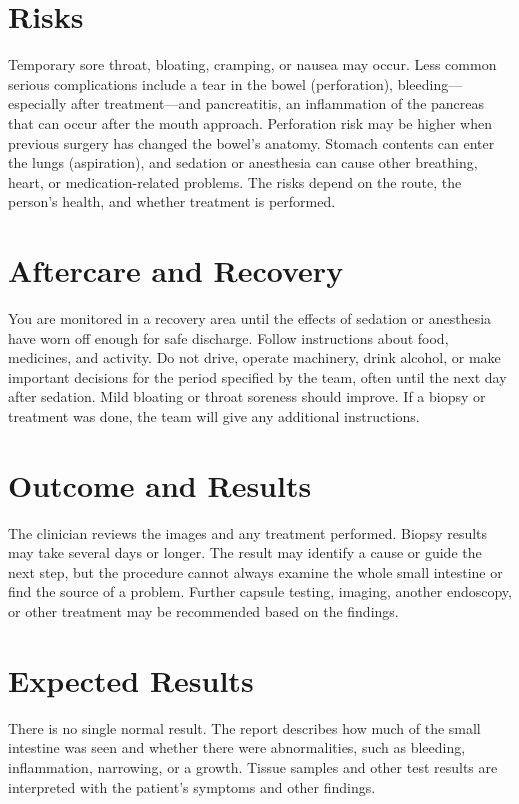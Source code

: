 \section*{Risks}
Temporary sore throat, bloating, cramping, or nausea may occur. Less common serious complications include a tear in the bowel (perforation), bleeding—especially after treatment—and pancreatitis, an inflammation of the pancreas that can occur after the mouth approach. Perforation risk may be higher when previous surgery has changed the bowel's anatomy. Stomach contents can enter the lungs (aspiration), and sedation or anesthesia can cause other breathing, heart, or medication-related problems. The risks depend on the route, the person's health, and whether treatment is performed.

\section*{Aftercare and Recovery}
You are monitored in a recovery area until the effects of sedation or anesthesia have worn off enough for safe discharge. Follow instructions about food, medicines, and activity. Do not drive, operate machinery, drink alcohol, or make important decisions for the period specified by the team, often until the next day after sedation. Mild bloating or throat soreness should improve. If a biopsy or treatment was done, the team will give any additional instructions.

\section*{Outcome and Results}
The clinician reviews the images and any treatment performed. Biopsy results may take several days or longer. The result may identify a cause or guide the next step, but the procedure cannot always examine the whole small intestine or find the source of a problem. Further capsule testing, imaging, another endoscopy, or other treatment may be recommended based on the findings.

\section*{Expected Results}
There is no single normal result. The report describes how much of the small intestine was seen and whether there were abnormalities, such as bleeding, inflammation, narrowing, or a growth. Tissue samples and other test results are interpreted with the patient's symptoms and other findings.


